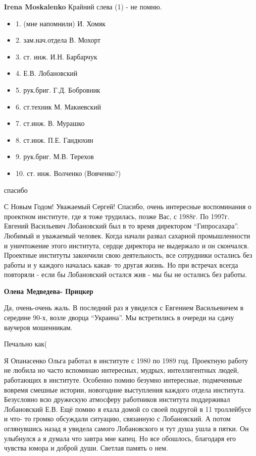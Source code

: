 \begin{itemize}
\begin{itemize} %
\textbf{Irena Moskalenko} Крайний слева (1) - не помню.
\begin{itemize}
  \item 1. (мне напомнили) И. Хомяк
  \item 2. зам.нач.отдела В. Мохорт
  \item 3. ст. инж. И.Н. Барбарчук
  \item 4. Е.В. Лобановский
  \item 5. рук.бриг. Г.Д. Бобровник
  \item 6. ст.техник М. Макиевский
  \item 7. ст.инж. В. Мурашко
  \item 8. ст.инж. П.Е. Гандюхин
  \item 9. рук.бриг. М.В. Терехов
  \item 10. ст. инж. Волченко (Вовченко?)
\end{itemize}
\end{itemize} %

спасибо


С Новым Годом! Уважаемый Сергей! Спасибо, очень интересные воспоминания о
проектном институте, где я тоже трудилась, позже Вас, с 1988г. По 1997г.
Евгений Васильевич Лобановский был в то время директором \enquote{Гипросахара}.
Любимый и уважаемый человек. Когда начали развал сахарной промышленности и
уничтожение этого института, сердце директора не выдержало и он скончался.
Проектные институты закончили свою деятельность, все сотрудники остались без
работы и у каждого началась какая- то другая жизнь. Но при встречах всегда
повторяли - если бы Лобановский остался жив - мы бы не остались без работы.

\begin{itemize} %
\textbf{Олена Медведева- Прицкер} 

Да, очень-очень жаль. В последний раз я увиделся с Евгением Васильевичем в
середине 90-х, возле дворца \enquote{Украина}. Мы встретились в очереди на сдачу
ваучеров мошенникам.

\end{itemize} %

Печально как(


Я Опанасенко Ольга работал в институте с 1980 по 1989 год. Проектную работу не
любила но часто вспоминаю интересных, мудрых, интеллигентных людей, работающих
в институте. Особенно помню безумно интересные, подмеченные вовремя смешные
истории, новогодние выступления каждого отдела института. Безусловно всю
дружескую атмосферу работников института поддерживал Лобановский Е.В. Ещё помню
я ехала домой со своей подругой в 11 троллейбусе и что- то громко обсуждали
ситуацию, связанную с Лобановский. А потом оглянувшись назад я увидела самого
Лобановского и тут душа ушла в пятки. Он улыбнулся а я думала что завтра мне
капец. Но все обошлось, благодаря его чувства юмора и доброй души. Светлая
память о нем.

\end{itemize} %
